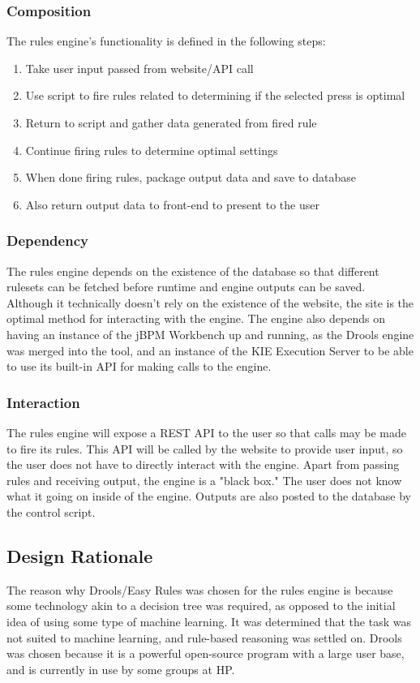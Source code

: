\documentclass[draftclsnofoot,onecolumn,10pt,compsoc]{IEEEtran}
\begin{document}
\subsubsection{Composition}
The rules engine's functionality is defined in the following steps:
\begin{enumerate}
    \item Take user input passed from website/API call
    \item Use script to fire rules related to determining if the selected press is optimal
    \item Return to script and gather data generated from fired rule
    \item Continue firing rules to determine optimal settings
    \item When done firing rules, package output data and save to database
    \item Also return output data to front-end to present to the user
\end{enumerate}

\subsubsection{Dependency}
The rules engine depends on the existence of the database so that different rulesets can be fetched before runtime and engine outputs can be saved. Although it technically doesn't rely on the existence of the website, the site is the optimal method for interacting with the engine. The engine also depends on having an instance of the jBPM Workbench up and running, as the Drools engine was merged into the tool, and an instance of the KIE Execution Server to be able to use its built-in API for making calls to the engine.

\subsubsection{Interaction}
The rules engine will expose a REST API to the user so that calls may be made to fire its rules. This API will be called by the website to provide user input, so the user does not have to directly interact with the engine. Apart from passing rules and receiving output, the engine is a "black box." The user does not know what it going on inside of the engine. Outputs are also posted to the database by the control script.

\subsection{Design Rationale}
The reason why Drools/Easy Rules was chosen for the rules engine is because some technology akin to a decision tree was required, as opposed to the initial idea of using some type of machine learning. It was determined that the task was not suited to machine learning, and rule-based reasoning was settled on. Drools was chosen because it is a powerful open-source program with a large user base, and is currently in use by some groups at HP.
\end{document}
